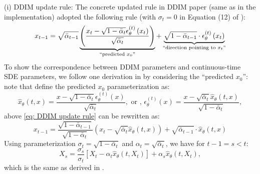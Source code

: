 \documentclass{article}
\theoremstyle{plain}
\theoremstyle{definition}
\theoremstyle{remark}
\begin{document}
(i) DDIM update rule: 
The concrete updated rule in DDIM paper (same as in the implementation) adopted the following rule (with $\sigma_t=0$ in Equation (12) of \cite{DDIM}):
\begin{equation}
\label{eq: DDIM update rule}
x_{t-1}=\sqrt{\bar{\alpha}_{t-1}} \underbrace{\left(\frac{x_t-\sqrt{1-\bar{\alpha}_t} \epsilon_\theta^{(t)}\left(x_t\right)}{\sqrt{\bar{\alpha}_t}}\right)}_{\text {``predicted } x_0 "}+\underbrace{\sqrt{1-\bar{\alpha}_{t-1}} \cdot \epsilon_\theta^{(t)}\left(x_t\right)}_{\text {``direction pointing to } x_t "}
\end{equation}
To show the correspondence between DDIM parameters and continuous-time SDE parameters, we follow one derivation in \cite{salimans2022progressive} by considering the ``predicted $x_0$'': note that define the predicted $x_0$ parameterization as: 
$$
\hat{x}_\theta\left(t,x\right) = \frac{x-\sqrt{1-\bar{\alpha}_t} \epsilon_\theta^{(t)}\left(x\right)}{\sqrt{\bar{\alpha}_t}},\text{ or , }\epsilon_\theta^{(t)}\left(x\right) = \frac{x- \sqrt{\bar{\alpha}_t}\hat{x}_\theta\left(t,x\right)}{\sqrt{1-\bar{\alpha}_t}},
$$
above \eqref{eq: DDIM update rule} can be rewritten as:
\begin{equation}
\label{DDIM rewritten}
x_{t-1}=\frac{\sqrt{1-\bar{\alpha}_{t-1}}}{\sqrt{1-\bar{\alpha}_t}} \left(x_t-\sqrt{\bar{\alpha}_t} \hat{x}_\theta\left(t,x\right)\right)+\sqrt{\bar{\alpha}_{t-1}} \cdot \hat{x}_\theta\left(t,x\right)
\end{equation}
Using parameterization $\sigma_t=\sqrt{1-\bar{\alpha}_{t}}$ and $\alpha_t = \sqrt{\bar{\alpha}_{t}}$, we have for $t-1 = s<t$:
\begin{equation}
\label{DDIM update rule continous}
X_s=\frac{\sigma_s}{\sigma_t}\left[X_t-\alpha_t \hat{x}_\theta\left(t,X_t\right)\right]+\alpha_s \hat{x}_\theta\left(t,X_t\right),
\end{equation}
which is the same as derived in \cite{kingma2021variationalDM,salimans2022progressive}.
\end{document}
